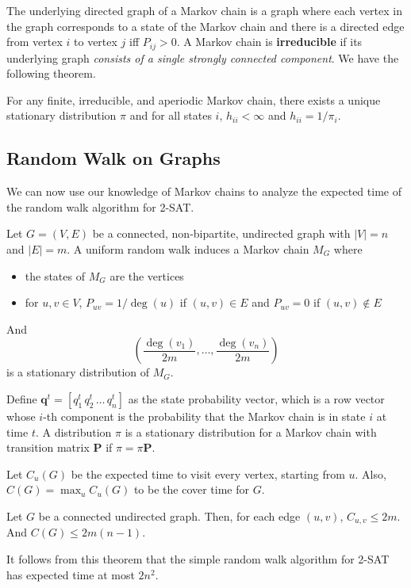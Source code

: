 The underlying directed graph of a Markov chain is a graph where each vertex in the graph corresponds to a state of the Markov chain
and there is a directed edge from vertex $i$ to vertex $j$ iff $P_{ij} > 0$. A Markov chain is \textbf{irreducible} if its underlying graph \textit{consists of a single strongly connected component}. We have the following theorem.

\begin{theorem}
    For any finite, irreducible, and aperiodic Markov chain, there exists a unique stationary distribution $\pi$ and for all states $i$, $h_{ii} < \infty$ and $h_{ii} = 1 / \pi_{i}$. 
\end{theorem}

\subsection{Random Walk on Graphs}

We can now use our knowledge of Markov chains to analyze the expected time of the random walk algorithm for 2-SAT.

Let $G=(V,E)$ be a connected, non-bipartite, undirected graph with $|V| = n$ and $|E| = m$. A uniform random walk induces a Markov chain $M_G$ where
\begin{itemize}
    \item the states of $M_G$ are the vertices
    \item for $u,v \in V$, $P_{uv} = 1 / \deg(u)$ if $(u,v) \in E$ and $P_{uv} = 0$ if $(u,v) \not\in E$
\end{itemize}
And
$$
\left( \frac{\deg(v_1)}{2m}, \ldots, \frac{\deg(v_n)}{2m} \right) 
$$
is a stationary distribution of $M_G$.

Define $\mathbf{q}^t = [ q_1^t\, q_2^t\, \ldots\, q_{n}^t ]$ as the state probability vector, which is a row vector whose $i$-th component is the probability that the Markov chain is in state $i$ at time $t$. A distribution $\pi$ is a stationary distribution for a Markov chain with transition matrix $\mathbf{P}$ if $\pi = \pi \mathbf{P}$.

Let $C_u(G)$ be the expected time to visit every vertex, starting from $u$. Also, $C(G) = \max_u C_u(G)$ to be the cover time for $G$.
\begin{theorem}[Aleliunas et al, 1979]
    Let $G$ be a connected undirected graph. Then, for each edge $(u,v)$, $C_{u,v} \leq 2m$. And $C(G) \leq 2m(n-1)$.
\end{theorem}
It follows from this theorem that the simple random walk algorithm for 2-SAT has expected time at most $2n^2$.

